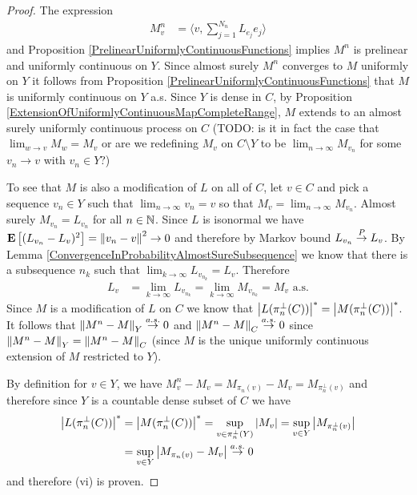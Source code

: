 \begin{proof}
The expression 
\begin{align*}
M^n_v &= \langle v, \sum_{j=1}^{N_n} L_{e_j} e_j \rangle
\end{align*}
and Proposition \ref{PrelinearUniformlyContinuousFunctions} implies $M^n$ is prelinear and uniformly continuous on $Y$.  Since almost surely $M^n$ converges to $M$ uniformly on $Y$ it follows from Proposition \ref{PrelinearUniformlyContinuousFunctions} that $M$ is uniformly continuous on $Y$ a.s.  Since $Y$ is dense in $C$, by Proposition \ref{ExtensionOfUniformlyContinuousMapCompleteRange}, $M$ extends to an almost surely uniformly continuous process on $C$ (TODO: is it in fact the case that $\lim_{w \to v} M_w = M_v$ or are we redefining $M_v$ on $C \setminus Y$ to be $\lim_{n \to \infty} M_{v_n}$ for some $v_n \to v$ with $v_n \in Y$?)

To see that $M$ is also a modification of $L$ on all of $C$, let $v \in C$ and pick a sequence $v_n \in Y$ such that $\lim_{n \to \infty} v_n = v$ so that $M_v = \lim_{n \to \infty} M_{v_n}$.   Almost surely $M_{v_n} = L_{v_n}$ for all $n \in \mathbb{N}$.  Since $L$ is isonormal we have $\textbf{E}\left[(L_{v_n} - L_v)^2\right] = \left \lVert v_n - v \right \rVert^2 \to 0$ and therefore by Markov bound $L_{v_n} \overset{P}\to L_v$.  By Lemma \ref{ConvergenceInProbabilityAlmostSureSubsequence} we know that there is a subsequence $n_k$ such that $\lim_{k \to \infty} L_{v_{n_k}} = L_v$.  Therefore 
\begin{align*}
L_v &= \lim_{k \to \infty} L_{v_{n_k}} = \lim_{k \to \infty} M_{v_{n_k}} = M_v \text{ a.s.}
\end{align*}
Since $M$ is a modification of $L$ on $C$ we know that $\left \vert L(\pi_n^\perp(C)) \right \vert^* = \left \vert M(\pi_n^\perp(C)) \right \vert^*$. It follows that $\left \lVert M^n - M \right \rVert_Y \overset{a.s.}\to 0$ and $\left \lVert M^n - M \right \rVert_C \overset{a.s.}\to 0$ since $\left \lVert M^n - M \right \rVert_Y = \left \lVert M^n - M \right \rVert_C$ (since $M$ is the unique uniformly continuous extension of $M$ restricted to $Y$).

By definition for $v \in Y$, we have
$M^n_v - M_v = M_{\pi_n(v)} - M_v = M_{\pi_n^\perp(v)}$ and therefore since $Y$ is a countable dense subset of $C$ we have 
\begin{align*}
\left \vert L(\pi_n^\perp(C)) \right \vert^* &= \left \vert M(\pi_n^\perp(C)) \right \vert^* = \sup_{v \in \pi_n^\perp(Y)} \left \vert M_v \right \vert = \sup_{v \in Y} \left \vert M_{\pi_n^\perp(v)}  \right \vert \\
&= \sup_{v \in Y} \left \vert M_{\pi_n(v)} - M_v \right \vert \overset{a.s.}\to 0
\end{align*}
and therefore (vi) is proven.


\end{proof}
